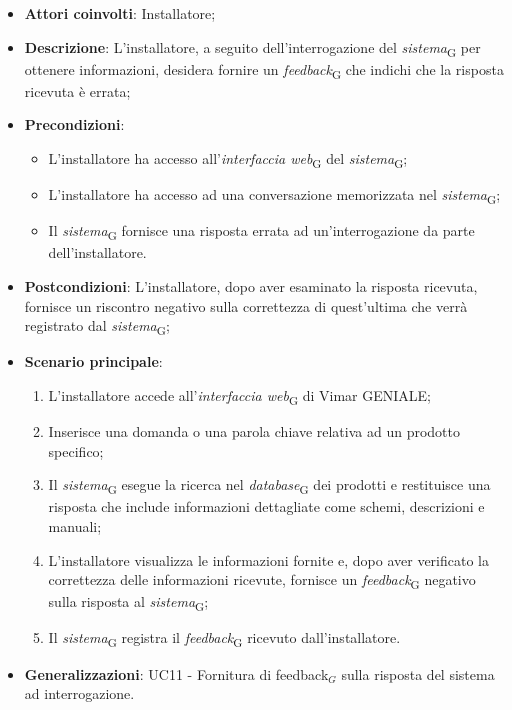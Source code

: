 \begin{itemize}
    \item \textbf{Attori coinvolti}: Installatore;
    \item \textbf{Descrizione}: L’installatore, a seguito dell’interrogazione del \textit{sistema}\textsubscript{G} per ottenere informazioni, desidera fornire un \textit{feedback}\textsubscript{G} che indichi che la risposta ricevuta è errata;
    \item \textbf{Precondizioni}: 
        \begin{itemize}
            \item L’installatore ha accesso all’\textit{interfaccia web}\textsubscript{G} del \textit{sistema}\textsubscript{G};
            \item L’installatore ha accesso ad una conversazione memorizzata nel \textit{sistema}\textsubscript{G};
            \item Il \textit{sistema}\textsubscript{G} fornisce una risposta errata ad un’interrogazione da parte dell’installatore.
        \end{itemize}
    \item \textbf{Postcondizioni}: L’installatore, dopo aver esaminato la risposta ricevuta, fornisce un riscontro negativo sulla correttezza di quest’ultima che verrà registrato dal \textit{sistema}\textsubscript{G};
    \item \textbf{Scenario principale}:
    \begin{enumerate}
    \item L’installatore accede all’\textit{interfaccia web}\textsubscript{G} di Vimar GENIALE;
    \item Inserisce una domanda o una parola chiave relativa ad un prodotto specifico;
    \item Il \textit{sistema}\textsubscript{G} esegue la ricerca nel \textit{database}\textsubscript{G} dei prodotti e restituisce una risposta che include informazioni dettagliate come schemi, descrizioni e manuali;
    \item L’installatore visualizza le informazioni fornite e, dopo aver verificato la correttezza delle informazioni ricevute, fornisce un \textit{feedback}\textsubscript{G} negativo sulla risposta al \textit{sistema}\textsubscript{G};
    \item Il \textit{sistema}\textsubscript{G} registra il \textit{feedback}\textsubscript{G} ricevuto dall’installatore.
    \end{enumerate}
    \item \textbf{Generalizzazioni}: UC11 - Fornitura di feedback$_G$ sulla risposta del sistema ad interrogazione.

\end{itemize}
